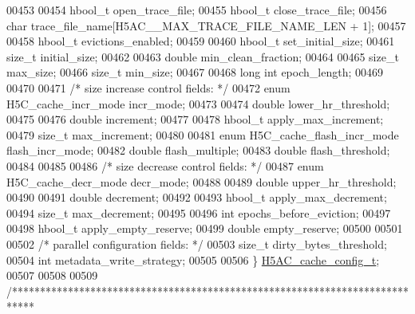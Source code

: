 \begin{DoxyCode}
00453 
00454     hbool\_t          open\_trace\_file;
00455     hbool\_t                  close\_trace\_file;
00456     \textcolor{keywordtype}{char}                     trace\_file\_name[H5AC\_\_MAX\_TRACE\_FILE\_NAME\_LEN + 1];
00457 
00458     hbool\_t                  evictions\_enabled;
00459 
00460     hbool\_t                  set\_initial\_size;
00461     \textcolor{keywordtype}{size\_t}                   initial\_size;
00462 
00463     \textcolor{keywordtype}{double}                   min\_clean\_fraction;
00464 
00465     \textcolor{keywordtype}{size\_t}                   max\_size;
00466     \textcolor{keywordtype}{size\_t}                   min\_size;
00467 
00468     \textcolor{keywordtype}{long} \textcolor{keywordtype}{int}                 epoch\_length;
00469 
00470 
00471     \textcolor{comment}{/* size increase control fields: */}
00472     \textcolor{keyword}{enum} H5C\_cache\_incr\_mode incr\_mode;
00473 
00474     \textcolor{keywordtype}{double}                   lower\_hr\_threshold;
00475 
00476     \textcolor{keywordtype}{double}                   increment;
00477 
00478     hbool\_t                  apply\_max\_increment;
00479     \textcolor{keywordtype}{size\_t}                   max\_increment;
00480 
00481     \textcolor{keyword}{enum} H5C\_cache\_flash\_incr\_mode      flash\_incr\_mode;
00482     \textcolor{keywordtype}{double}                              flash\_multiple;
00483     \textcolor{keywordtype}{double}                              flash\_threshold;
00484 
00485 
00486     \textcolor{comment}{/* size decrease control fields: */}
00487     \textcolor{keyword}{enum} H5C\_cache\_decr\_mode decr\_mode;
00488 
00489     \textcolor{keywordtype}{double}                   upper\_hr\_threshold;
00490 
00491     \textcolor{keywordtype}{double}                   decrement;
00492 
00493     hbool\_t                  apply\_max\_decrement;
00494     \textcolor{keywordtype}{size\_t}                   max\_decrement;
00495 
00496     \textcolor{keywordtype}{int}                      epochs\_before\_eviction;
00497 
00498     hbool\_t                  apply\_empty\_reserve;
00499     \textcolor{keywordtype}{double}                   empty\_reserve;
00500 
00501 
00502     \textcolor{comment}{/* parallel configuration fields: */}
00503     \textcolor{keywordtype}{size\_t}                   dirty\_bytes\_threshold;
00504     \textcolor{keywordtype}{int}                      metadata\_write\_strategy;
00505 
00506 \} \hyperlink{struct_h5_a_c__cache__config__t}{H5AC\_cache\_config\_t};
00507 
00508 
00509 \textcolor{comment}{/****************************************************************************}

\end{DoxyCode}
